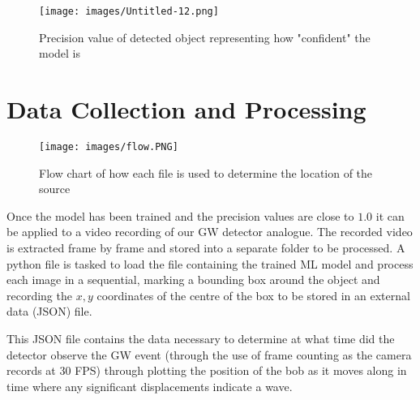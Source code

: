 \begin{figure}
    \centering
    \texttt{[image: images/Untitled-12.png]}
    \caption{Precision value of detected object representing how "confident" the model is}
    \label{fig:AP}
\end{figure}



\section{Data Collection and Processing}
\label{sec:3.4}

\begin{figure}[h!]
    \centering
    \texttt{[image: images/flow.PNG]}
    \caption{Flow chart of how each file is used to determine the location of the source}
    \label{fig:flow}
\end{figure}

Once the model has been trained and the precision values are close to $1.0$ it can be applied to a video recording of our GW detector analogue. The recorded video is extracted frame by frame and stored into a separate folder \cite{boxer_2025_15041819} to be processed. A python file is tasked to load the file containing the trained ML model and process each image in a sequential, marking a bounding box around the object and recording the $x,y $ coordinates of the centre of the box to be stored in an external data (JSON) file.

This JSON file contains the data necessary to determine at what time did the detector observe the GW event (through the use of frame counting as the camera records at 30 FPS) through plotting the position of the bob as it moves along in time where any significant displacements indicate a wave. 

